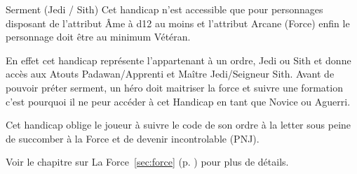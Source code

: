 \begin{paperbox}{Serment (Jedi / Sith)}
    Cet handicap n'est accessible que pour personnages disposant de l'attribut \^Ame à d12 au moins et l'attribut Arcane (Force) enfin le personnage doit être au minimum Vétéran. 

    En effet cet handicap représente l'appartenant à un ordre, Jedi ou Sith et donne accès aux Atouts Padawan/Apprenti et Maître Jedi/Seigneur Sith. Avant de pouvoir préter serment, un héro doit maitriser la force et suivre une formation c'est pourquoi il ne peur accéder à cet Handicap en tant que Novice ou Aguerri.

    Cet handicap oblige le joueur à suivre le code de son ordre à la letter sous peine de succomber à la Force et de devenir incontrolable (PNJ).

    Voir le chapitre sur La Force~\ref{sec:force} (p. \pageref{sec:force}) pour plus de détails.
\end{paperbox}

